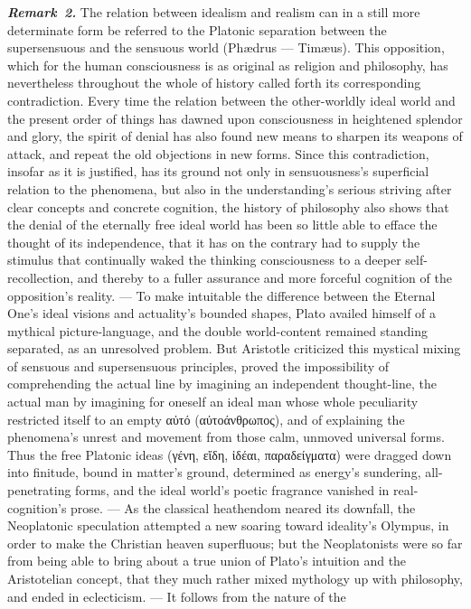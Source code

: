 \documentclass[12pt]{book}
\newcommand{\anm}[1]{\emph{\textbf{Remark~#1.}}}
\begin{document}
\anm{2} The relation between idealism and realism can in a still more
determinate form be referred to the Platonic separation between the
supersensuous and the sensuous world (Phædrus --- Timæus). This opposition,
which for the human consciousness is as original as religion and philosophy,
has nevertheless throughout the whole of history called forth its
corresponding contradiction. Every time the relation between the
other-worldly ideal world and the present order of things has dawned upon
consciousness in heightened splendor and glory, the spirit of denial has
also found new means to sharpen its weapons of attack, and repeat the old
objections in new forms. Since this contradiction, insofar as it is
justified, has its ground not only in sensuousness's superficial relation to
the phenomena, but also in the understanding's serious striving after clear
concepts and concrete cognition, the history of philosophy also shows that
the denial of the eternally free ideal world has been so little able to
efface the thought of its independence, that it has on the contrary had to
supply the stimulus that continually waked the thinking consciousness to a
deeper self-recollection, and thereby to a fuller assurance and more
forceful cognition of the opposition's reality. --- To make intuitable the
difference between the Eternal One's ideal visions and actuality's bounded
shapes, Plato availed himself of a mythical picture-language, and the double
world-content remained standing separated, as an unresolved problem. But
Aristotle criticized this mystical mixing of sensuous and supersensuous
principles, proved the impossibility of comprehending the actual line by
imagining an independent thought-line, the actual man by imagining for
oneself an ideal man whose whole peculiarity restricted itself to an empty
αὐτό (αὐτοάνθρωπος), and of explaining the phenomena's unrest and movement
from those calm, unmoved universal forms. Thus the free Platonic ideas
(γένη, εἴδη, ἰδέαι, παραδείγματα) were dragged down into finitude, bound in
matter's ground, determined as energy's sundering, all-penetrating forms,
and the ideal world's poetic fragrance vanished in real-cognition's prose.
--- As the classical heathendom neared its downfall, the Neoplatonic
speculation attempted a new soaring toward ideality's Olympus, in order to
make the Christian heaven superfluous; but the Neoplatonists were so far
from being able to bring about a true union of Plato's intuition and the
Aristotelian concept, that they much rather mixed mythology up with
philosophy, and ended in eclecticism. --- It follows from the nature of the
\end{document}
